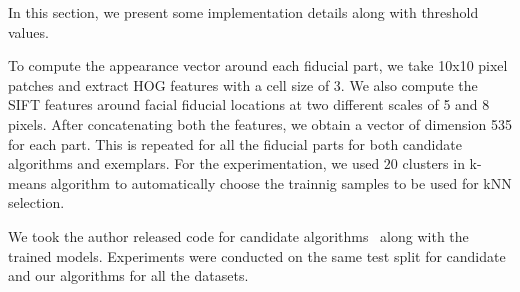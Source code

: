 \label{subsec:implementation_details}

In this section, we present some implementation details along with threshold values.

To compute the appearance vector around each fiducial part, we take 10x10 pixel patches and extract 
HOG features with a cell size of 3. We also compute the SIFT features around facial fiducial 
locations at two different scales of 5 and 8 pixels. After concatenating both the features, we obtain a 
vector of dimension 535 for each part. This is repeated for all the fiducial parts for both
candidate algorithms and exemplars.
% 
For the experimentation, we used $20$ clusters in k-means algorithm to automatically choose the
trainnig samples to be used for kNN selection. 

We took the author released code for candidate algorithms~\cite{xhuCVPR12_wild, xiongCVPR13_SDM,  
artizzzuICCV13_COFW, asthanaCVPR14_Chehra, Tzimiropoulos_2015_CVPR} along with the trained models. Experiments were conducted
on the same test split for candidate and our algorithms for all the datasets.
